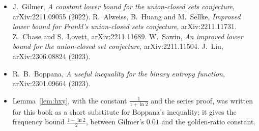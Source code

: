 \begin{itemize}
arXiv:1309.3297: the origin of the conjecture and the small cases.
\item J.~Gilmer, \emph{A constant lower bound for the union-closed sets conjecture}, arXiv:2211.09055 (2022). R.~Alweiss, B.~Huang and M.~Sellke,
\emph{Improved lower bound for Frankl's union-closed sets conjecture}, arXiv:2211.11731. Z.~Chase and S.~Lovett, arXiv:2211.11689. W.~Sawin,
\emph{An improved lower bound for the union-closed set conjecture}, arXiv:2211.11504. J.~Liu, arXiv:2306.08824 (2023).
\item R.~B.~Boppana, \emph{A useful inequality for the binary entropy function}, arXiv:2301.09664 (2023).
\item Lemma~\ref{lem:hxy}, with the constant $\frac1{1+\ln2}$ and the series proof, was written for this book as a short substitute for Boppana's
inequality; it gives the frequency bound $\frac{1-\ln2}2$, between Gilmer's $0.01$ and the golden-ratio constant.
\end{itemize}

